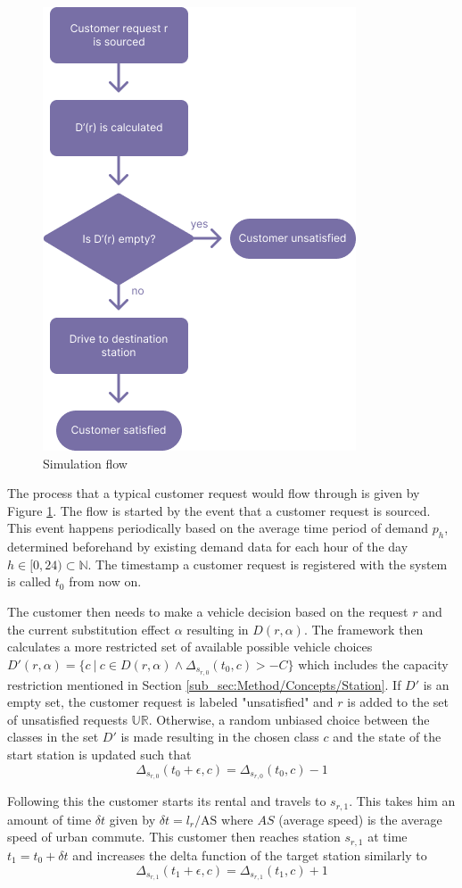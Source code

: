 \begin{figure}[htbp]
  \centering
  \includegraphics[width=.4\linewidth]{./Figures/event-flow.png}
  \caption{Simulation flow}
  \label{fig:Flow}
\end{figure}

The process that a typical customer request would flow through is given by Figure \ref{fig:Flow}. The flow is started by the
event that a customer request is sourced. This event happens periodically based on the average time period of demand $p_h$, determined
beforehand by existing demand data for each hour of the day $h \in [0,24) \subset \mathbb{N}$. The timestamp a customer request is registered with the system
is called $t_0$ from now on.

The customer then needs to make a vehicle decision based on the request $r$ and the current substitution effect
 $\alpha$ resulting in $D(r, \alpha)$. The framework then calculates a more restricted set of available
possible vehicle choices $D'(r, \alpha) = \{c \ |\ c \in D(r, \alpha) \land \Delta_{s_{r, 0}}(t_0, c) > -C\}$ which
includes the capacity restriction mentioned in Section \ref{sub_sec:Method/Concepts/Station}. If $D'$ is an empty set, the customer
request is labeled "unsatisfied" and $r$ is added to the set of unsatisfied requests $\mathbb{UR}$. Otherwise, a random unbiased choice between the classes in 
the set $D'$ is made resulting in the chosen class $c$ and the state of the start station is updated such that 
$$
\Delta_{s_{r, 0}}(t_0 + \epsilon, c) = \Delta_{s_{r, 0}}(t_0, c) - 1
$$
 
Following this the customer starts its rental and travels to $s_{r, 1}$. This takes him an amount of time $\delta t$ given by 
$\delta t = l_r / \text{AS}$ where $AS$ (average speed) is the average speed of urban commute. This customer then reaches
station $s_{r, 1}$ at time $t_1 = t_0 + \delta t$ and increases the delta function of the target station similarly to
$$
\Delta_{s_{r, 1}}(t_1 + \epsilon, c) = \Delta_{s_{r, 1}}(t_1, c) + 1
$$

